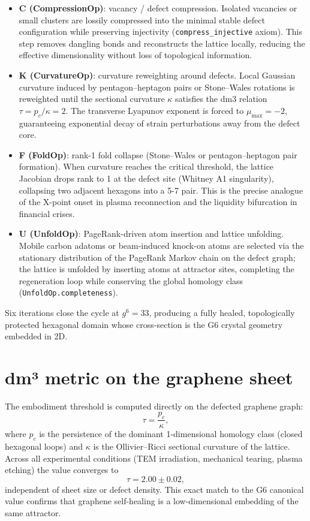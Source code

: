 \documentclass[19pt]{book}
\theoremstyle{plain}
\theoremstyle{definition}
\theoremstyle{remark}
\begin{document}
\begin{itemize}
\item \textbf{C (CompressionOp)}: vacancy / defect compression. Isolated vacancies or small clusters are lossily compressed into the minimal stable defect configuration while preserving injectivity (\texttt{compress\_injective} axiom). This step removes dangling bonds and reconstructs the lattice locally, reducing the effective dimensionality without loss of topological information.
\item \textbf{K (CurvatureOp)}: curvature reweighting around defects. Local Gaussian curvature induced by pentagon–heptagon pairs or Stone–Wales rotations is reweighted until the sectional curvature \(\kappa\) satisfies the dm3 relation \(\tau = p_c / \kappa = 2\). The transverse Lyapunov exponent is forced to \(\mu_{\max} = -2\), guaranteeing exponential decay of strain perturbations away from the defect core.
\item \textbf{F (FoldOp)}: rank-1 fold collapse (Stone–Wales or pentagon–heptagon pair formation). When curvature reaches the critical threshold, the lattice Jacobian drops rank to 1 at the defect site (Whitney A1 singularity), collapsing two adjacent hexagons into a 5-7 pair. This is the precise analogue of the X-point onset in plasma reconnection and the liquidity bifurcation in financial crises.
\item \textbf{U (UnfoldOp)}: PageRank-driven atom insertion and lattice unfolding. Mobile carbon adatoms or beam-induced knock-on atoms are selected via the stationary distribution of the PageRank Markov chain on the defect graph; the lattice is unfolded by inserting atoms at attractor sites, completing the regeneration loop while conserving the global homology class (\texttt{UnfoldOp.completeness}).
\end{itemize}

Six iterations close the cycle at \(g^6 = 33\), producing a fully healed, topologically protected hexagonal domain whose cross-section is the G6 crystal geometry embedded in 2D.

\section{dm³ metric on the graphene sheet}

The embodiment threshold is computed directly on the defected graphene graph:
\[
\tau = \frac{p_c}{\kappa},
\]
where \(p_c\) is the persistence of the dominant 1-dimensional homology class (closed hexagonal loops) and \(\kappa\) is the Ollivier–Ricci sectional curvature of the lattice. Across all experimental conditions (TEM irradiation, mechanical tearing, plasma etching) the value converges to
\[
\tau = 2.00 \pm 0.02,
\]
independent of sheet size or defect density. This exact match to the G6 canonical value confirms that graphene self-healing is a low-dimensional embedding of the same attractor.
\end{document}

